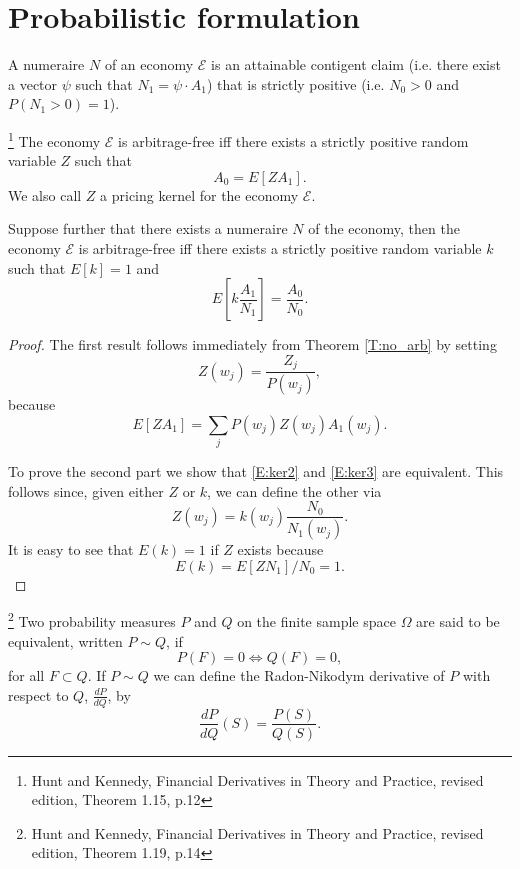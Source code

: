 \section{Probabilistic formulation}

\begin{definition}
A numeraire $N$ of an economy $\mathcal{E}$ is an attainable contigent claim 
(i.e. there exist a vector $\psi$ such that $N_1=\psi\cdot A_1$) that is 
strictly positive (i.e. $N_0>0$ and $P(N_1>0)=1$).
\end{definition}

\begin{theorem} \label{T:no_arb2}
\footnote{Hunt and Kennedy, Financial Derivatives in Theory and Practice, 
    revised edition, Theorem 1.15, p.12}
The economy $\mathcal{E}$ is arbitrage-free iff there exists a strictly positive
random variable $Z$ such that
\begin{equation} \label{E:ker2}
  A_0 = E[Z A_1].
\end{equation}
We also call $Z$ a pricing kernel for the economy $\mathcal{E}$.

Suppose further that there exists a numeraire $N$ of the economy,
then the economy $\mathcal{E}$ is arbitrage-free iff there exists a strictly 
positive random variable $k$ such that $E[k]=1$ and
\begin{equation} \label{E:ker3}
  E\left[ k \frac{A_1}{N_1} \right] = \frac{A_0}{N_0}.
\end{equation}
\end{theorem}
\begin{proof}
The first result follows immediately from Theorem \ref{T:no_arb} by setting
\[
  Z(w_j) = \frac{Z_j}{P(w_j)},
\]
because
\[
  E[Z A_1] = \sum_j P(w_j) Z(w_j) A_1(w_j).
\]

To prove the second part we show that \ref{E:ker2} and \ref{E:ker3} are
equivalent. This follows since, given either $Z$ or $k$, we can define
the other via
\[
  Z(w_j) = k(w_j) \frac{N_0}{N_1(w_j)}.
\]
It is easy to see that $E(k)=1$ if $Z$ exists because 
\[
  E(k) = E[Z N_1] / N_0 = 1.
\]
\end{proof}


\begin{definition}
\footnote{Hunt and Kennedy, Financial Derivatives in Theory and Practice, 
    revised edition, Theorem 1.19, p.14}
Two probability measures $P$ and $Q$ on the finite sample space $\Omega$ are
said to be equivalent, written $P\sim Q$, if 
\[
  P(F)=0 \Leftrightarrow Q(F)=0,
\]
for all $F\subset Q$. If $P\sim Q$ we can define the Radon-Nikodym derivative of
$P$ with respect to $Q$, $\frac{dP}{dQ}$, by
\[
  \frac{dP}{dQ}(S) = \frac{P(S)}{Q(S)}.
\]
\end{definition}

